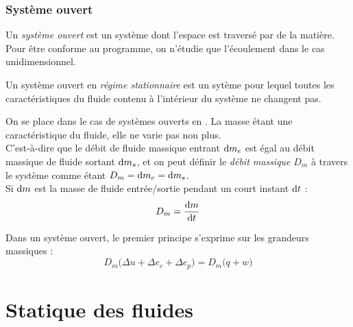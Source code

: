 \documentclass[11pt,a4paper,fleqn,pdftex]{report}
\begin{document}
\subsection{Système ouvert} %
\label{sub:systeme_ouvert}
\begin{dfn}
   Un \emph{système ouvert} est un système dont l'espace est traversé par de la matière. \\
   Pour être conforme au programme, on n'étudie que l'écoulement dans le cas unidimensionnel.
\end{dfn}
\begin{dfn}
   Un système ouvert en \emph{régime stationnaire} est un sytème pour lequel toutes les caractéristiques du fluide contenu à l'intérieur du système ne changent pas.
\end{dfn}
\begin{dfn}
   On se place dans le cas de systèmes ouverts en . La masse étant une caractéristique du fluide, elle ne varie pas non plus. \\
   C'est-à-dire que le débit de fluide massique entrant $\mathrm{d} m_e$ est égal au débit massique de fluide sortant $\mathrm{d} m_s$, et on peut définir le \emph{débit massique} $D_m$ à travers le système comme étant $D_m =\mathrm{d} m_e = \mathrm{d} m_s$.\\
   Si $\mathrm{d} m$ est la masse de fluide entrée/sortie pendant un court instant $\mathrm{d} t$ : 
   \begin{equation}
   D_m = \dfrac{\mathrm{d} m}{\mathrm{d} t}
   \end{equation}
\end{dfn}
\begin{itheorem}
   Dans un système ouvert, le premier principe s'exprime sur les grandeurs massiques : 
   \begin{equation}
   D_m \bigg( \Delta u + \Delta e_c +\Delta e_p \bigg) = D_m \big( q + w \big)
   \end{equation}
\end{itheorem}
\chapter{Statique des fluides} %
\label{cha:statique_des_fluides}
\end{document}
